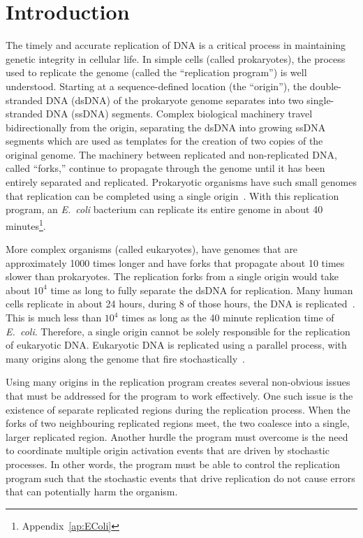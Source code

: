 \chapter{Introduction}
\label{ch:Introduction'}

The timely and accurate replication of DNA is a critical process in maintaining genetic integrity in cellular life.
In simple cells (called prokaryotes), the process used to replicate the genome (called the ``replication program'') is well understood.
Starting at a sequence-defined location (the ``origin''), the double-stranded DNA (dsDNA) of the prokaryote genome separates into two single-stranded DNA (ssDNA) segments.
Complex biological machinery travel bidirectionally from the origin, separating the dsDNA into growing ssDNA segments which are used as templates for the creation of two copies of the original genome.
The machinery between replicated and non-replicated DNA, called ``forks,'' continue to propagate through the genome until it has been entirely separated and replicated.
Prokaryotic organisms have such small genomes that replication can be completed using a single origin~\cite{MolecularCellBiology}.
With this replication program, an \emph{E.~coli} bacterium can replicate its entire genome in about 40 minutes\footnote{Appendix~\ref{ap:EColi}}.

More complex organisms (called eukaryotes), have genomes that are approximately 1000 times longer and have forks that propagate about 10 times slower than prokaryotes.
The replication forks from a single origin would take about $10^4$ time as long to fully separate the dsDNA for replication.
Many human cells replicate in about 24 hours, during 8 of those hours, the DNA is replicated~\cite{CellMolApproach}.
This is much less than $10^4$ times as long as the 40 minute replication time of \emph{E.~coli}.
Therefore, a single origin cannot be solely responsible for the replication of eukaryotic DNA.
Eukaryotic DNA is replicated using a parallel process, with many origins along the genome that fire stochastically~\cite{eukaryotereview}.

Using many origins in the replication program creates several non-obvious issues that must be addressed for the program to work effectively.
One such issue is the existence of separate replicated regions during the replication process.
When the forks of two neighbouring replicated regions meet, the two coalesce into a single, larger replicated region.
Another hurdle the program must overcome is the need to coordinate multiple origin activation events that are driven by stochastic processes.
In other words, the program must be able to control the replication program such that the stochastic events that drive replication do not cause errors that can potentially harm the organism.~\cite{eukaryotereview}


